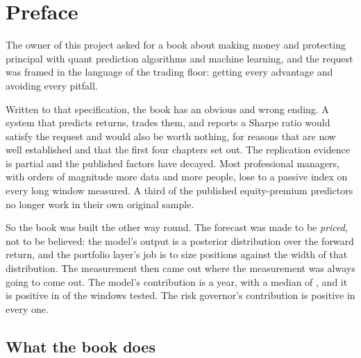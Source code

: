 \chapter*{Preface}
\thispagestyle{plain}

The owner of this project asked for a book about making money and
protecting principal with quant prediction algorithms and machine learning,
and the request was framed in the language of the trading floor: getting
every advantage and avoiding every pitfall.

Written to that specification, the book has an obvious and wrong ending.
A system that predicts returns, trades them, and reports a Sharpe ratio
would satisfy the request and would also be worth nothing, for reasons
that are now well established and that the first four chapters set out.
The replication evidence is partial and the published factors have decayed.
Most professional managers, with orders of magnitude more data and more
people, lose to a passive index on every long window measured. A third of
the published equity-premium predictors no longer work in their own
original sample.

So the book was built the other way round. The forecast was made to be
\emph{priced}, not to be believed: the model's output is a posterior
distribution over the forward return, and the portfolio layer's job is to
size positions against the width of that distribution. The measurement
then came out where the measurement was always going to come out. The
model's contribution is \numTiltMean{} a year, with a median of
\numTiltMedian{}, and it is positive in \numTiltPosFrac{} of the
windows tested. The risk governor's contribution is positive in every
one.

\section*{What the book does}

